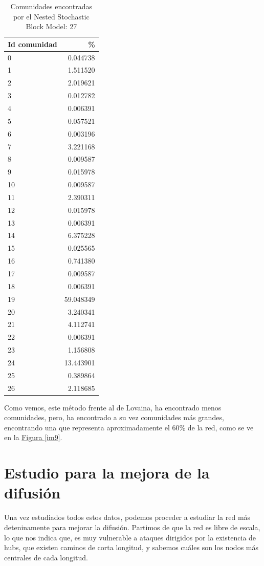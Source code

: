 \documentclass[paper=a4, fontsize=11pt]{article} %
\numberwithin{equation}{section} %
\numberwithin{figure}{section} %
\numberwithin{table}{section} %
\begin{document}
\begin{table}
\begin{tabular}{l|r}
Id comunidad & \%\\
\hline
0 & 0.044738 \\
1 & 1.511520 \\
2 & 2.019621 \\
3 & 0.012782 \\
4 & 0.006391 \\
5 & 0.057521 \\
6 & 0.003196 \\
7 & 3.221168 \\
8 & 0.009587 \\
9 & 0.015978 \\
10 & 0.009587 \\
11 & 2.390311 \\
12 & 0.015978 \\
13 & 0.006391 \\
14 & 6.375228 \\
15 & 0.025565 \\
16 & 0.741380 \\
17 & 0.009587 \\
18 & 0.006391 \\
19 & 59.048349 \\
20 & 3.240341 \\
21 & 4.112741 \\
22 & 0.006391 \\
23 & 1.156808 \\
24 & 13.443901 \\
25 & 0.389864 \\
26 & 2.118685 \\
\end{tabular}
\label{coms3}
\caption{Comunidades encontradas por el Nested Stochastic Block Model:  27}
\end{table}

Como vemos, este método frente al de Lovaina, ha encontrado menos comunidades, pero, ha encontrado a su vez comunidades más grandes, encontrando una que representa aproximadamente el 60\% de la red, como se ve en la \hyperref[im9]{Figura \ref*{im9}}.

\section{Estudio para la mejora de la difusión}

Una vez estudiados todos estos datos, podemos proceder a estudiar la red más deteninamente para mejorar la difusión. Partimos de que la red es libre de escala, lo que nos indica que, es muy vulnerable a ataques dirigidos por la existencia de hubs, que existen caminos de corta longitud, y sabemos cuáles son los nodos más centrales de cada longitud.
\end{document}
